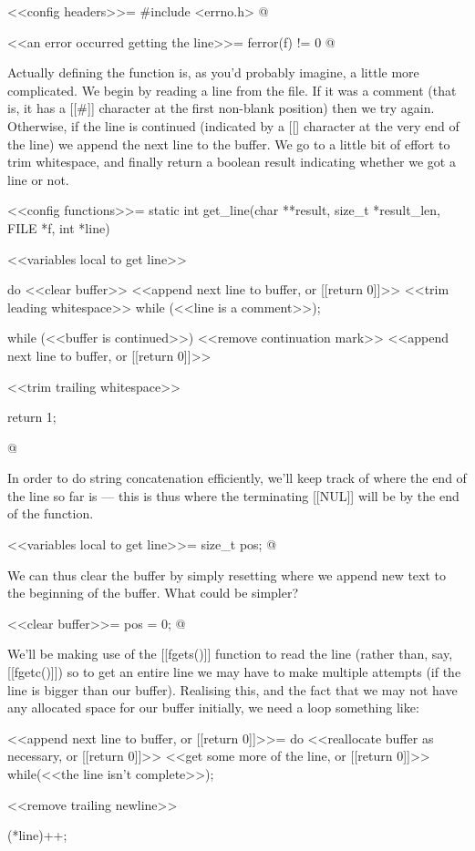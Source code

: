 \documentclass{article}
\begin{document}
<<config headers>>=
#include <errno.h>
@ 

<<an error occurred getting the line>>=
ferror(f) != 0
@ 

Actually defining the function is, as you'd probably imagine, a little
more complicated. We begin by reading a line from the file. If it was
a comment (that is, it has a [[#]] character at the first non-blank
position) then we try again. Otherwise, if the line is continued
(indicated by a [[\]] character at the very end of the line) we append
the next line to the buffer. We go to a little bit of effort to trim
whitespace, and finally return a boolean result indicating whether we
got a line or not.

<<config functions>>=
static int get_line(char **result, size_t *result_len, FILE *f, int *line) {
	<<variables local to get line>>

	do {
		<<clear buffer>>
		<<append next line to buffer, or [[return 0]]>>
		<<trim leading whitespace>>
	} while (<<line is a comment>>);

	while (<<buffer is continued>>) {
		<<remove continuation mark>>
		<<append next line to buffer, or [[return 0]]>>
	}

	<<trim trailing whitespace>>

	return 1;
}
@ 

In order to do string concatenation efficiently, we'll keep track of
where the end of the line so far is --- this is thus where the
terminating [[NUL]] will be by the end of the function.

<<variables local to get line>>=
size_t pos;
@ 

We can thus clear the buffer by simply resetting where we append new
text to the beginning of the buffer. What could be simpler?

<<clear buffer>>=
pos = 0;
@ 

We'll be making use of the [[fgets()]] function to read the line
(rather than, say, [[fgetc()]]) so to get an entire line we may have
to make multiple attempts (if the line is bigger than our
buffer). Realising this, and the fact that we may not have any
allocated space for our buffer initially, we need a loop something
like:

<<append next line to buffer, or [[return 0]]>>=
do {
	<<reallocate buffer as necessary, or [[return 0]]>>
	<<get some more of the line, or [[return 0]]>>
} while(<<the line isn't complete>>);

<<remove trailing newline>>

(*line)++;
\end{document}
